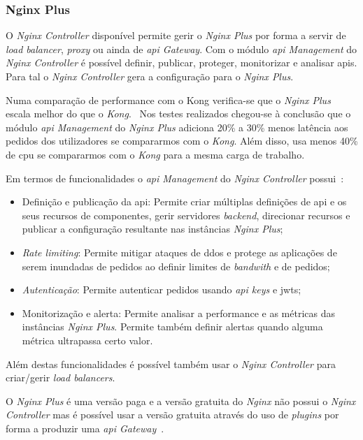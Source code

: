 \subsubsection{Nginx Plus}

O \textit{Nginx Controller} disponível permite gerir o \textit{Nginx Plus} por forma a servir de \textit{load balancer}, \textit{proxy} ou ainda de \textit{\acrshort{api} Gateway}. Com o módulo \textit{\acrshort{api} Management} do \textit{Nginx Controller} é possível definir, publicar, proteger, monitorizar e analisar \acrshort{api}s. 
Para tal o \textit{Nginx Controller} gera a configuração para o \textit{Nginx Plus}.

Numa comparação de performance com o Kong verifica-se que o \textit{Nginx Plus} escala melhor do que o \textit{Kong}.~\cite{nginxPvsKong} Nos testes realizados chegou-se à conclusão que o módulo \textit{\acrshort{api} Management} do \textit{Nginx Plus} adiciona 20\% a 30\% menos latência aos pedidos dos utilizadores se compararmos com o \textit{Kong}. 
Além disso, usa menos 40\% de \acrshort{cpu} se compararmos com o \textit{Kong} para a mesma carga de trabalho.

Em termos de funcionalidades o \textit{\acrshort{api} Management} do \textit{Nginx Controller} possui~\cite{nginxP}:
\begin{itemize}
    \item Definição e publicação da \acrshort{api}: Permite criar múltiplas definições de \acrshort{api} e os seus recursos de componentes, gerir servidores \textit{backend}, direcionar recursos e publicar a configuração resultante nas instâncias \textit{Nginx Plus};
    \item \textit{Rate limiting}: Permite mitigar ataques de \acrshort{ddos} e protege as aplicações de serem inundadas de pedidos ao definir limites de \textit{bandwith} e de pedidos;
    \item \textit{Autenticação}: Permite autenticar pedidos usando \textit{\acrshort{api} keys} e \acrshort{jwt}s;
    \item Monitorização e alerta: Permite analisar a performance e as métricas das 
    instâncias \textit{Nginx Plus}. Permite também definir alertas quando alguma métrica ultrapassa certo valor.
\end{itemize}

Além destas funcionalidades é possível também usar o \textit{Nginx Controller} para criar/gerir \textit{load balancers}. 

O \textit{Nginx Plus} é uma versão paga e a versão gratuita do \textit{Nginx} não possui o \textit{Nginx Controller} mas é possível usar a versão gratuita através do uso de \textit{plugins} por forma a produzir uma \textit{\acrshort{api} Gateway}~\cite{compAPIGat}. 

